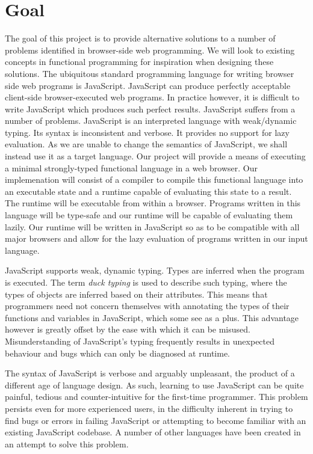 
\section*{Goal}
The goal of this project is to provide alternative solutions to a number of problems
identified in browser-side web programming. We will look to existing concepts in 
functional programming for inspiration when designing these solutions. The ubiquitous 
standard programming language for writing browser side web programs is JavaScript. 
JavaScript can produce 
perfectly acceptable client-side browser-executed web programs. In practice however, 
it is difficult to write JavaScript which produces such perfect results. JavaScript 
suffers from a number of problems. JavaScript is an
interpreted language with weak/dynamic typing. Its syntax is inconsistent and verbose.
It provides no support for lazy evaluation. As we are unable to change the semantics
of JavaScript, we shall instead use it as a target language. Our project will 
provide a means of executing a minimal strongly-typed functional language in a web
browser. Our implemenation will consist of a compiler to 
compile this functional language into an executable state and a runtime capable of 
evaluating this state to a result. The runtime will be executable from within a browser.
Programs written in this language will be type-safe and our runtime will be capable
of evaluating them lazily. Our runtime will be written in JavaScript so as to be 
compatible with all major browsers and allow for the lazy evaluation of programs
written in our input language.

JavaScript supports weak, dynamic typing. Types are inferred when the program is
executed. The term \emph{duck typing} is used to describe such typing, where the types
of objects are inferred based on their attributes. This means that programmers need
not concern themselves with annotating the types of their functions and variables in
JavaScript, which some see as a plus. This advantage however is greatly offset by
the ease with which it can be misused. Misunderstanding of JavaScript's typing 
frequently results in unexpected behaviour and bugs which can only be diagnosed at
runtime. 

The syntax of JavaScript is verbose and arguably unpleasant, the product of a different
age of language design. As such, learning to use JavaScript can be quite painful, tedious
and counter-intuitive for the first-time programmer. This problem persists even for
more experienced users, in the difficulty inherent in trying to find bugs or errors in
failing JavaScript or attempting to become familiar with an existing JavaScript codebase.
A number of other languages have been created in an attempt to solve this problem.


